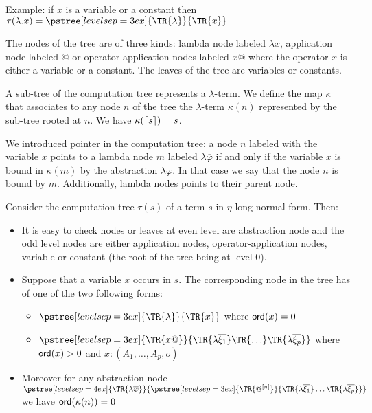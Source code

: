Example: if $x$ is a variable or a constant then
$ \cmptre{\lambda . x} =
  \pstree[levelsep=3ex]
    { \TR{\lambda } }
    { \TR{x}
    }$

The nodes of the tree are of three kinds: lambda node labeled
 $\lambda \overline{x}$, application node labeled $@$ or
operator-application nodes labeled $x @$ where the operator $x$ is
either a variable or a constant. The leaves of the tree are
variables or constants.

A sub-tree of the computation tree represents a $\lambda$-term. We
define the map $\kappa$ that associates to any node $n$ of the tree
the $\lambda$-term $\kappa(n)$ represented by the sub-tree rooted at
$n$. We have $\kappa(\lceil s\rceil) = s$.

We introduced pointer in the computation tree: a node $n$ labeled
with the variable $x$ points to a lambda node $m$ labeled $\lambda
\overline{\varphi}$ if and only if the variable $x$ is bound in
$\kappa(m)$ by the abstraction $\lambda \overline{\varphi}$. In that
case we say that the node $n$ is bound by $m$. Additionally, lambda nodes points to their parent node.


Consider the computation tree $\tau(s)$ of a term $s$ in $\eta$-long normal form. Then:
\begin{itemize}
\item It is easy to check nodes or leaves at even level are abstraction
node and the odd level nodes are either application nodes,
operator-application nodes, variable or constant (the root of the
tree being at level $0$).

\item Suppose that a variable $x$ occurs in $s$. The corresponding node in the tree has of one of the two following forms:
    \begin{itemize}
    \item $ \pstree[levelsep=3ex]
        { \TR{\lambda } }
        { \TR{x}
        }$ where ${\sf ord}(x) = 0$

    \item $ \pstree[levelsep=3ex]
                { \TR{x @} }
                { \TR{\lambda \overline{\xi_1}} \TR{\ldots} \TR{\lambda \overline{\xi_p}}}
        $ where ${\sf ord}(x) > 0$ and $x:(A_1,\ldots,A_p,o)$
    \end{itemize}

\item    Moreover for any abstraction node
        $ \pstree[levelsep=4ex]
            { \TR{\lambda \overline{\varphi}} }
            { \pstree[levelsep=3ex]
                {\TR{@^{[n]}}}
                {\TR{\lambda \overline{\xi_1}} \ldots \TR{\lambda \overline{\xi_p}}}
            }
        $
    we have ${\sf ord}(\kappa(n))=0$

\end{itemize}

